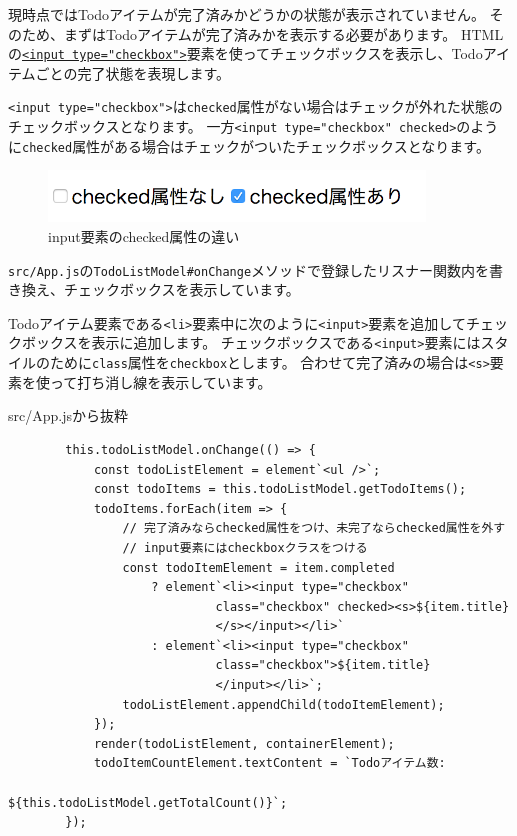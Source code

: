 現時点ではTodoアイテムが完了済みかどうかの状態が表示されていません。
そのため、まずはTodoアイテムが完了済みかを表示する必要があります。
HTMLの\href{https://developer.mozilla.org/ja/docs/Web/HTML/Element/Input/checkbox}{\texttt{<input type="checkbox">}}要素を使ってチェックボックスを表示し、Todoアイテムごとの完了状態を表現します。

\texttt{<input type="checkbox">}は\texttt{checked}属性がない場合はチェックが外れた状態のチェックボックスとなります。
一方\texttt{<input type="checkbox" checked>}のように\texttt{checked}属性がある場合はチェックがついたチェックボックスとなります。

\begin{figure}[h]
\centering
\includegraphics[width=100mm]{./fig/input-checkbox.png}
\caption{input要素のchecked属性の違い}
\end{figure}

\texttt{src/App.js}の\texttt{TodoListModel\#onChange}メソッドで登録したリスナー関数内を書き換え、チェックボックスを表示しています。

Todoアイテム要素である\texttt{<li>}要素中に次のように\texttt{<input>}要素を追加してチェックボックスを表示に追加します。
チェックボックスである\texttt{<input>}要素にはスタイルのために\texttt{class}属性を\texttt{checkbox}とします。
合わせて完了済みの場合は\texttt{<s>}要素を使って打ち消し線を表示しています。

\begin{listtitle}
src/App.jsから抜粋
\end{listtitle}
\begin{lstlisting}
        this.todoListModel.onChange(() => {
            const todoListElement = element`<ul />`;
            const todoItems = this.todoListModel.getTodoItems();
            todoItems.forEach(item => {
                // 完了済みならchecked属性をつけ、未完了ならchecked属性を外す
                // input要素にはcheckboxクラスをつける
                const todoItemElement = item.completed
                    ? element`<li><input type="checkbox" 
                             class="checkbox" checked><s>${item.title}
                             </s></input></li>`
                    : element`<li><input type="checkbox" 
                             class="checkbox">${item.title}
                             </input></li>`;
                todoListElement.appendChild(todoItemElement);
            });
            render(todoListElement, containerElement);
            todoItemCountElement.textContent = `Todoアイテム数: 
                                     ${this.todoListModel.getTotalCount()}`;
        });
\end{lstlisting}
\listend


